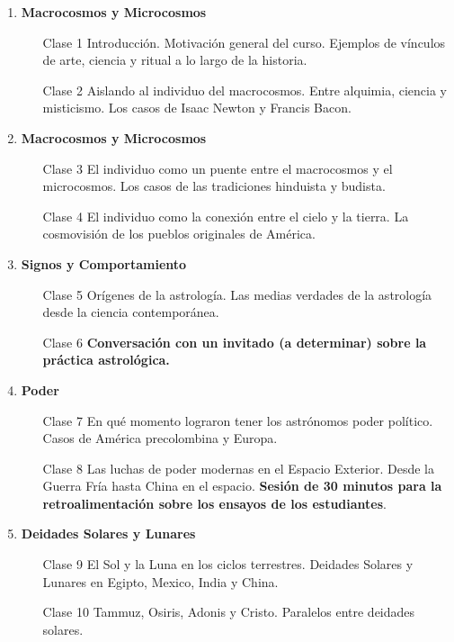 \documentclass[12pt]{report}
\begin{document}
\begin{enumerate}
\item {\bf Macrocosmos y Microcosmos}
\begin{itemize}
\item[Clase 1] Introducci\'on. Motivaci\'on general del
  curso. Ejemplos de v\'inculos de arte, ciencia y ritual a lo
  largo de la historia.
\item[Clase 2] Aislando al individuo del macrocosmos. Entre alquimia, ciencia y
  misticismo. Los casos de Isaac Newton y Francis Bacon.  
\end{itemize}

\item {\bf Macrocosmos y Microcosmos}
\begin{itemize}
\item[Clase 3] El individuo como un puente entre el macrocosmos y el
  microcosmos. Los casos de las tradiciones hinduista y budista.
\item[Clase 4] El individuo como la conexi\'on entre el cielo y la
  tierra. La cosmovisi\'on de los pueblos originales de Am\'erica.
\end{itemize}

\item {\bf Signos y Comportamiento}
\begin{itemize}
\item[Clase 5] Or\'igenes de la astrolog\'ia. Las medias verdades de
  la astrolog\'ia desde la ciencia contempor\'anea. 
\item[Clase 6] {\bf Conversaci\'on con un invitado (a determinar) sobre
  la pr\'actica astrol\'ogica.} 
\end{itemize}

\item {\bf Poder}
\begin{itemize}
\item[Clase 7] En qu\'e momento lograron tener los astr\'onomos poder
  pol\'itico. Casos de Am\'erica precolombina y Europa.
\item[Clase 8] Las luchas de poder modernas en el Espacio
  Exterior. Desde la Guerra Fr\'ia hasta China en el espacio. 
  {\bf Sesi\'on de 30 minutos para la retroalimentaci\'on sobre los
    ensayos de los estudiantes}. 
\end{itemize}

\item {\bf Deidades Solares y Lunares}
\begin{itemize}
\item[Clase 9] El Sol y la Luna en los ciclos terrestres. Deidades
  Solares y Lunares en Egipto, Mexico, India y China.
\item[Clase 10] Tammuz, Osiris, Adonis y Cristo. Paralelos entre
  deidades solares.
\end{itemize}


\end{enumerate}
\end{document}
